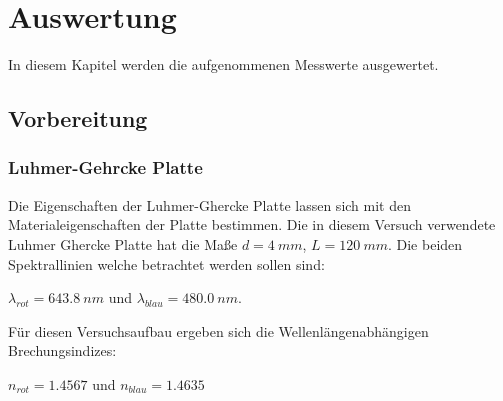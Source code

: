


\section{Auswertung}
\label{sec:auswertung}

In diesem Kapitel werden die aufgenommenen Messwerte ausgewertet.
\subsection{Vorbereitung}
\label{sec:vorbereitunf}
\subsubsection{Luhmer-Gehrcke Platte}
\label{sec:luhmer}
Die Eigenschaften der Luhmer-Ghercke Platte lassen sich mit den Materialeigenschaften
der Platte bestimmen. Die in diesem Versuch verwendete Luhmer Ghercke Platte hat die
Maße $d=\SI[]{4}[]{mm}$, $L=\SI[]{120}[]{mm}$. Die beiden Spektrallinien welche betrachtet werden sollen
sind:
\begin{center}
  $\lambda_{rot}=\SI[]{643.8}[]{nm}$ und
  $\lambda_{blau}=\SI[]{480.0}[]{nm}$.
\end{center}
Für diesen Versuchsaufbau ergeben sich die Wellenlängenabhängigen Brechungsindizes:
\begin{center}
  $n_{rot}=1.4567$ und
  $n_{blau}=1.4635$
\end{center}

